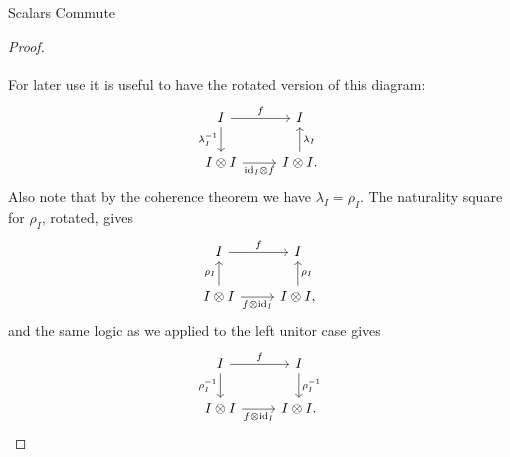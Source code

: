 \documentclass[fleqn]{NotesClass}
\DeclareMathOperator{\id}{id}
\begin{document}
\begin{lma}{Scalars Commute}{}
\begin{proof}
\begin{equation}
\begin{tikzcd}
                \end{tikzcd}
            \end{equation}
            For later use it is useful to have the rotated version of this diagram:
            \begin{equation}
                \begin{tikzcd}
                    I \arrow[r, "f"] \arrow[d, "\lambda_I^{-1}"'] & I\\
                    I \otimes I \arrow[r, "{\id_I} \otimes f"'] & I \otimes I. \arrow[u, "\lambda_I"']
                \end{tikzcd}
            \end{equation}
            Also note that by the coherence theorem we have \(\lambda_I = \rho_I\).
            The naturality square for \(\rho_I\), rotated, gives
            \begin{equation}
                \begin{tikzcd}
                    I \arrow[r, "f"] & I \\
                    I\otimes I \arrow[r, "f \otimes \id_I"'] \arrow[u, "\rho_I"] & I\otimes I, \arrow[u, "\rho_I"']
                \end{tikzcd}
            \end{equation}
            and the same logic as we applied to the left unitor case gives
            \begin{equation}
                \begin{tikzcd}
                    I \arrow[r, "f"] \arrow[d, "\rho_I^{-1}"'] & I \arrow[d, "\rho_I^{-1}"]\\
                    I \otimes I \arrow[r, "f \otimes \id_I"'] & I \otimes I.
                \end{tikzcd}
            \end{equation}
            

\end{proof}
\end{lma}
\end{document}

